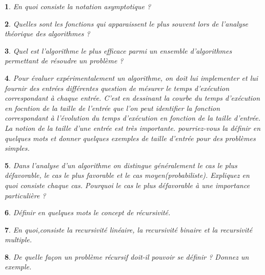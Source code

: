 \documentclass[12pt,a4paper,oneside]{book}
\newtheorem{Qu}{}
\begin{document}
\begin{Qu}
	En quoi consiste la notation asymptotique ?
\end{Qu}
\begin{Qu}
	Quelles sont les fonctions qui apparaissent le plus souvent lors de l'analyse théorique des algorithmes ?
\end{Qu}
\begin{Qu}
	Quel est l'algorithme le plus efficace parmi un ensemble d'algorithmes permettant de résoudre un problème ?
\end{Qu}
\begin{Qu}
	Pour évaluer expérimentalement un algorithme, on doit lui implementer et lui fournir des entrées différentes question de mésurer le temps d'exécution correspondant à chaque entrée. C'est en dessinant la courbe du temps d'exécution en focntion de la taille de l'entrée que l'on peut identifier la fonction correspondant à l'évolution du temps d'exécution en fonction de la taille d'entrée. La notion de la taille d'une entrée est très importante. pourriez-vous la définir en quelques mots et donner quelques exemples de taille d'entrée pour des problèmes simples.
\end{Qu}
\begin{Qu}
	Dans l'analyse d'un algorithme on distingue généralement le cas le plus défavorable, le cas le plus favorable et le cas moyen(probabiliste). Expliquez en quoi consiste chaque cas. Pourquoi le cas  le plus  défavorable à une importance particulière ?
\end{Qu}
\begin{Qu}
	Définir en quelques mots le concept de récursivité.
\end{Qu}
\begin{Qu}
	En quoi,consiste la recursivité linéaire, la recursivité binaire et la recursivité multiple.
\end{Qu}
\begin{Qu}
	De quelle façon un problème récursif doit-il pouvoir se définir ? Donnez un exemple.
\end{Qu}
\newpage
\end{document}
